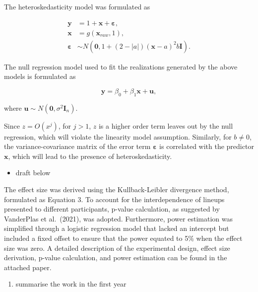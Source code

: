 \documentclass[11pt,a4paper,]{article}
\providecommand{\tightlist}{%
  \setlength{\itemsep}{0pt}\setlength{\parskip}{0pt}}
\begin{document}
The heteroskedasticity model was formulated as

\begin{align} \label{eq:heter-model}
\boldsymbol{y} &= 1 + \boldsymbol{x} + \boldsymbol{\varepsilon},\\
\boldsymbol{x} &= g(\boldsymbol{x}_{raw}, 1),\\
\boldsymbol{\varepsilon} &\sim N(\boldsymbol{0}, 1 + (2 - |a|)(\boldsymbol{x} - a)^2b \boldsymbol{I}). 
\end{align}

The null regression model used to fit the realizations generated by the above models is formulated as

\begin{equation} \label{eq:null-model}
\boldsymbol{y} = \beta_0 + \beta_1 \boldsymbol{x} + \boldsymbol{u},
\end{equation}

\noindent where \(\boldsymbol{u} \sim N(\boldsymbol{0}, \sigma^2\boldsymbol{I}_n)\).

Since \(z = O(x^j)\), for \(j > 1\), \(z\) is a higher order term leaves out by the null regression, which will violate the linearity model assumption. Similarly, for \(b \neq 0\), the variance-covariance matrix of the error term \(\boldsymbol{\varepsilon}\) is correlated with the predictor \(\boldsymbol{x}\), which will lead to the presence of heteroskedasticity.

\begin{itemize}
\tightlist
\item
  draft below
\end{itemize}

The effect size was derived using the Kullback-Leibler divergence method, formulated as Equation 3. To account for the interdependence of lineups presented to different participants, p-value calculation, as suggested by VanderPlas et al.~(2021), was adopted. Furthermore, power estimation was simplified through a logistic regression model that lacked an intercept but included a fixed offset to ensure that the power equated to 5\% when the effect size was zero. A detailed description of the experimental design, effect size derivation, p-value calculation, and power estimation can be found in the attached paper.

\begin{enumerate}
\def\labelenumi{\arabic{enumi}.}
\setcounter{enumi}{2}
\tightlist
\item
  summarise the work in the first year
\end{enumerate}
\end{document}
